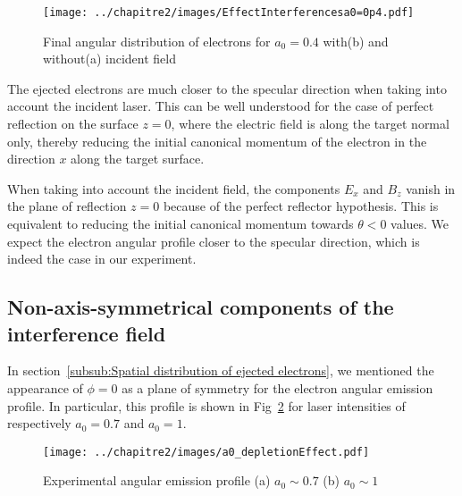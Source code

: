 \begin{figure}[H]
\begin{center}
\texttt{[image: ../chapitre2/images/EffectInterferencesa0=0p4.pdf]}
\end{center}
\caption{\label{fig:SumUpa0=1_w0=3} Final angular distribution of electrons for $a_0 = 0.4$ with(b) and without(a) incident field}
\end{figure}

\noindent The ejected electrons are much closer to the specular direction when taking into account the incident laser. This can be well understood for the case of perfect reflection on the surface $z=0$, where the electric field is along the target normal only, thereby reducing the initial canonical momentum of the electron in the direction $x$ along the target surface.


\noindent When taking into account the incident field, the components $E_x$ and $B_z$ vanish in the plane of reflection $z=0$ because of the perfect reflector hypothesis. This is equivalent to reducing the initial canonical momentum towards $\theta <0$ values. We expect the electron angular profile closer to the specular direction, which is indeed the case in our experiment. 

\subsection{Non-axis-symmetrical components of the interference field}\label{sub:Influence of non axisymmetrical component of the interference field}

In section~\ref{subsub:Spatial distribution of ejected electrons}, we mentioned the appearance of $\phi =0$ as a plane of symmetry for the electron angular emission profile. In particular, this profile is shown in Fig~\ref{fig:a0_depletionEffect} for laser intensities of respectively $a_0 = 0.7$ and $a_0 = 1$.



\begin{figure}[H]
\centering
\texttt{[image: ../chapitre2/images/a0\_depletionEffect.pdf]}\\
\caption{\label{fig:a0_depletionEffect} Experimental angular emission profile (a) $a_0 \sim 0.7$ (b) $a_0\sim 1$}
\end{figure}

